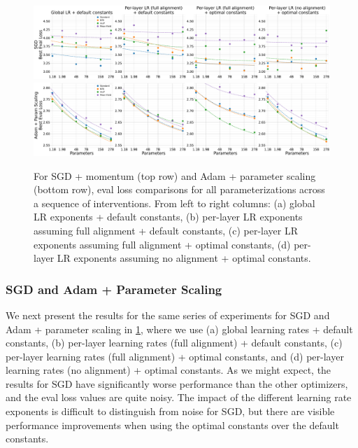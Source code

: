 \documentclass{article}
\theoremstyle{plain}
\theoremstyle{definition}
\theoremstyle{remark}
\begin{document}
\begin{figure}[ht]
    \centering
    \includegraphics[width=\textwidth]{icml2024/figures/per_layer_lr/sgd_additive_interventions.pdf}
    \vspace{2pt}
    \includegraphics[width=\textwidth]{icml2024/figures/per_layer_lr/adamw_ps_on_additive_interventions.pdf}
    \caption{For SGD + momentum (top row) and Adam + parameter scaling (bottom row), eval loss comparisons for all parameterizations across a sequence of interventions. From left to right columns: (a) global LR exponents + default constants, (b) per-layer LR exponents assuming full alignment + default constants, (c) per-layer LR exponents assuming full alignment + optimal constants, (d) per-layer LR exponents assuming no alignment + optimal constants.}
    \label{fig:sgd_adam_ps_additive_interventions}
\end{figure}

\subsubsection{SGD and Adam + Parameter Scaling}
We next present the results for the same series of experiments for SGD and Adam + parameter scaling in \cref{fig:sgd_adam_ps_additive_interventions}, where we use (a) global learning rates + default constants, (b) per-layer learning rates (full alignment) + default constants, (c) per-layer learning rates (full alignment) + optimal constants, and (d) per-layer learning rates (no alignment) + optimal constants. As we might expect, the results for SGD have significantly worse performance than the other optimizers, and the eval loss values are quite noisy. The impact of the different learning rate exponents is difficult to distinguish from noise for SGD, but there are visible performance improvements when using the optimal constants over the default constants.
\end{document}
